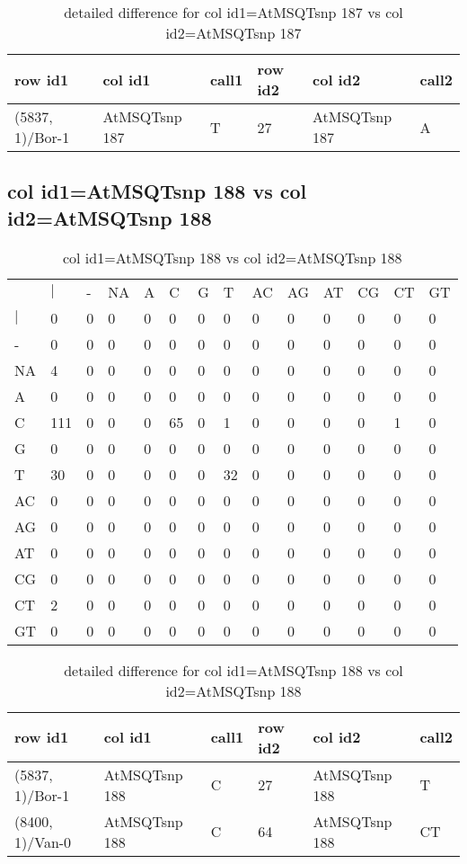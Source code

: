 \begin{center}
\begin{longtable}{|l|l|l|l|l|l|}
\caption{detailed difference for col id1=AtMSQTsnp 187 vs col id2=AtMSQTsnp 187} \label{table_dm565}\\
\hline
row id1&col id1&call1&row id2&col id2&call2\\
\hline
(5837, 1)/Bor-1&AtMSQTsnp 187&T&27&AtMSQTsnp 187&A\\
\hline
\end{longtable}
\end{center}

\subsection{col id1=AtMSQTsnp 188 vs col id2=AtMSQTsnp 188}
\begin{center}
\begin{longtable}{|l|l|l|l|l|l|l|l|l|l|l|l|l|l|}
\caption{col id1=AtMSQTsnp 188 vs col id2=AtMSQTsnp 188} \label{table_dm566}\\
\hline
\\
\hline
&$|$&-&NA&A&C&G&T&AC&AG&AT&CG&CT&GT\\
$|$&0&0&0&0&0&0&0&0&0&0&0&0&0\\
-&0&0&0&0&0&0&0&0&0&0&0&0&0\\
NA&4&0&0&0&0&0&0&0&0&0&0&0&0\\
A&0&0&0&0&0&0&0&0&0&0&0&0&0\\
C&111&0&0&0&65&0&1&0&0&0&0&1&0\\
G&0&0&0&0&0&0&0&0&0&0&0&0&0\\
T&30&0&0&0&0&0&32&0&0&0&0&0&0\\
AC&0&0&0&0&0&0&0&0&0&0&0&0&0\\
AG&0&0&0&0&0&0&0&0&0&0&0&0&0\\
AT&0&0&0&0&0&0&0&0&0&0&0&0&0\\
CG&0&0&0&0&0&0&0&0&0&0&0&0&0\\
CT&2&0&0&0&0&0&0&0&0&0&0&0&0\\
GT&0&0&0&0&0&0&0&0&0&0&0&0&0\\
\hline
\end{longtable}
\end{center}

\begin{center}
\begin{longtable}{|l|l|l|l|l|l|}
\caption{detailed difference for col id1=AtMSQTsnp 188 vs col id2=AtMSQTsnp 188} \label{table_dm567}\\
\hline
row id1&col id1&call1&row id2&col id2&call2\\
\hline
(5837, 1)/Bor-1&AtMSQTsnp 188&C&27&AtMSQTsnp 188&T\\
(8400, 1)/Van-0&AtMSQTsnp 188&C&64&AtMSQTsnp 188&CT\\
\hline
\end{longtable}
\end{center}

